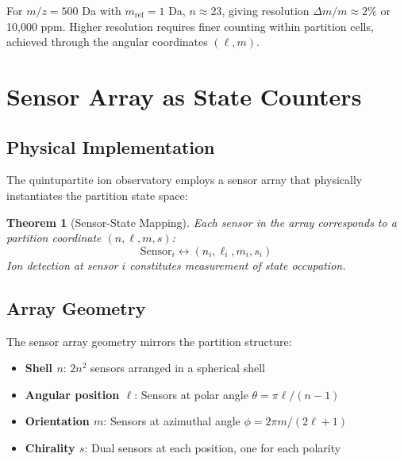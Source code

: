 \documentclass[twocolumn,10pt]{article}
\newtheorem{theorem}{Theorem}[section]
\begin{document}
For $m/z = 500$ Da with $m_{\text{ref}} = 1$ Da, $n \approx 23$, giving resolution $\Delta m/m \approx 2\%$ or 10,000 ppm. Higher resolution requires finer counting within partition cells, achieved through the angular coordinates $(\ell, m)$.

\section{Sensor Array as State Counters}
\label{sec:sensors}

\subsection{Physical Implementation}

The quintupartite ion observatory employs a sensor array that physically instantiates the partition state space:

\begin{theorem}[Sensor-State Mapping]
\label{thm:sensor_state}
Each sensor in the array corresponds to a partition coordinate $(n, \ell, m, s)$:
\begin{equation}
    \text{Sensor}_i \leftrightarrow (n_i, \ell_i, m_i, s_i)
\end{equation}
Ion detection at sensor $i$ constitutes measurement of state occupation.
\end{theorem}

\subsection{Array Geometry}

The sensor array geometry mirrors the partition structure:

\begin{itemize}
    \item \textbf{Shell $n$}: $2n^2$ sensors arranged in a spherical shell
    \item \textbf{Angular position $\ell$}: Sensors at polar angle $\theta = \pi\ell/(n-1)$
    \item \textbf{Orientation $m$}: Sensors at azimuthal angle $\phi = 2\pi m/(2\ell + 1)$
    \item \textbf{Chirality $s$}: Dual sensors at each position, one for each polarity
\end{itemize}
\end{document}

